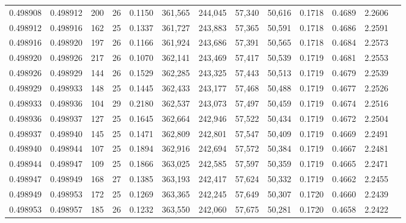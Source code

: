 \begin{tabular}{rrrrrrrrrrrrr}
0.498908 & 0.498912 & 200 &  26 &                                     0.1150 & 361,565 & 244,045 &  57,340 &  50,616 & 0.1718 & 0.4689 & 2.2606 \\
0.498912 & 0.498916 & 162 &  25 &                                     0.1337 & 361,727 & 243,883 &  57,365 &  50,591 & 0.1718 & 0.4686 & 2.2591 \\
0.498916 & 0.498920 & 197 &  26 &                                     0.1166 & 361,924 & 243,686 &  57,391 &  50,565 & 0.1718 & 0.4684 & 2.2573 \\
0.498920 & 0.498926 & 217 &  26 &                                     0.1070 & 362,141 & 243,469 &  57,417 &  50,539 & 0.1719 & 0.4681 & 2.2553 \\
0.498926 & 0.498929 & 144 &  26 &                                     0.1529 & 362,285 & 243,325 &  57,443 &  50,513 & 0.1719 & 0.4679 & 2.2539 \\
0.498929 & 0.498933 & 148 &  25 &                                     0.1445 & 362,433 & 243,177 &  57,468 &  50,488 & 0.1719 & 0.4677 & 2.2526 \\
0.498933 & 0.498936 & 104 &  29 &                                     0.2180 & 362,537 & 243,073 &  57,497 &  50,459 & 0.1719 & 0.4674 & 2.2516 \\
0.498936 & 0.498937 & 127 &  25 &                                     0.1645 & 362,664 & 242,946 &  57,522 &  50,434 & 0.1719 & 0.4672 & 2.2504 \\
0.498937 & 0.498940 & 145 &  25 &                                     0.1471 & 362,809 & 242,801 &  57,547 &  50,409 & 0.1719 & 0.4669 & 2.2491 \\
0.498940 & 0.498944 & 107 &  25 &                                     0.1894 & 362,916 & 242,694 &  57,572 &  50,384 & 0.1719 & 0.4667 & 2.2481 \\
0.498944 & 0.498947 & 109 &  25 &                                     0.1866 & 363,025 & 242,585 &  57,597 &  50,359 & 0.1719 & 0.4665 & 2.2471 \\
0.498947 & 0.498949 & 168 &  27 &                                     0.1385 & 363,193 & 242,417 &  57,624 &  50,332 & 0.1719 & 0.4662 & 2.2455 \\
0.498949 & 0.498953 & 172 &  25 &                                     0.1269 & 363,365 & 242,245 &  57,649 &  50,307 & 0.1720 & 0.4660 & 2.2439 \\
0.498953 & 0.498957 & 185 &  26 &                                     0.1232 & 363,550 & 242,060 &  57,675 &  50,281 & 0.1720 & 0.4658 & 2.2422 \\

\end{tabular}
